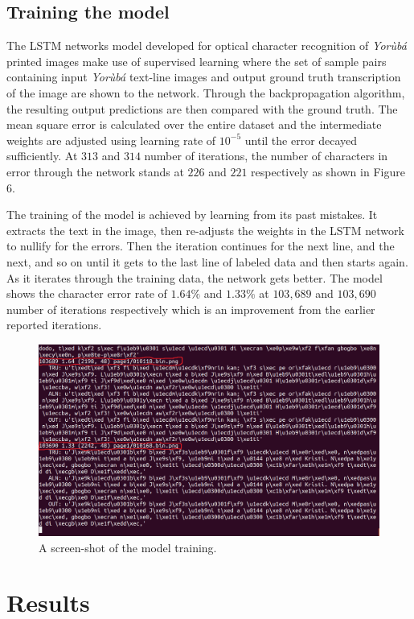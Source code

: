 \documentclass[review]{elsarticle}
\newcommand{\yor}{\textit{Yor\`ub\'a }}
\begin{document}
\subsection{Training the model}
The LSTM networks model developed for optical character recognition of \yor printed images make use of supervised learning where the set of sample pairs containing input \yor text-line images and output ground truth transcription of the image are shown to the network. Through the backpropagation algorithm, the resulting output predictions are then compared with the ground truth. The mean square error is calculated over the entire dataset and the intermediate weights are adjusted using learning rate of $10^{-5}$ until the error decayed sufficiently. At $313$ and $314$ number of iterations, the number of characters in error through the network stands at $226$ and $221$ respectively as shown in Figure 6.

The training of the model is achieved by learning from its past mistakes. It extracts the text in the image, then re-adjusts the weights in the LSTM network to nullify for the errors. Then the iteration continues for the next line, and the next, and so on until it gets to the last line of labeled data and then starts again. As it iterates through the training data, the network gets better. The model shows the character error rate of $1.64\%$ and $1.33\%$ at $103,689$ and $103,690$ number of iterations respectively which is an improvement from the earlier reported iterations.

\begin{figure}[h]
\centering
\includegraphics[width=1.1\linewidth]{train2}
\caption{A screen-shot of the model training.}
\label{fig:train2}
\end{figure}

\section{Results}
\end{document}
